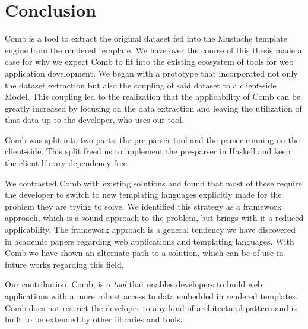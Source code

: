 \documentclass[thesis.tex]{subfiles}
\begin{document}
\chapter{Conclusion}
\label{ch:conclusion}
Comb is a tool to extract the original dataset fed into the Mustache template
engine from the rendered template. We have over the course of this thesis made a
case for why we expect Comb to fit into the existing ecosystem of tools for web
application development. We began with a prototype that incorporated not only
the dataset extraction but also the coupling of said dataset to a client-side
Model.
This coupling led to the realization that the applicability of Comb can be
greatly increased by focusing on the data extraction and leaving the utilization
of that data up to the developer, who uses our tool.

Comb was split into two parts: the pre-parser tool and the parser running on
the client-side. This split freed us to implement the pre-parser in Haskell
and keep the client library dependency free.

We contrasted Comb with existing solutions and found that most of these require
the developer to switch to new templating languages explicitly made for the
problem they are trying to solve. We identified this strategy as a framework
approach, which is a sound approach to the problem, but brings with it a reduced
applicability. The framework approach is a general tendency we have discovered
in academic papers regarding web applications and templating languages. With
Comb we have shown an alternate path to a solution, which can be of use in
future works regarding this field.

Our contribution, Comb, is a \emph{tool} that enables developers to
build web applications with a more robust access to data embedded in rendered
templates. Comb does not restrict the developer to any kind of architectural
pattern and is built to be extended by other libraries and tools.

\end{document}
